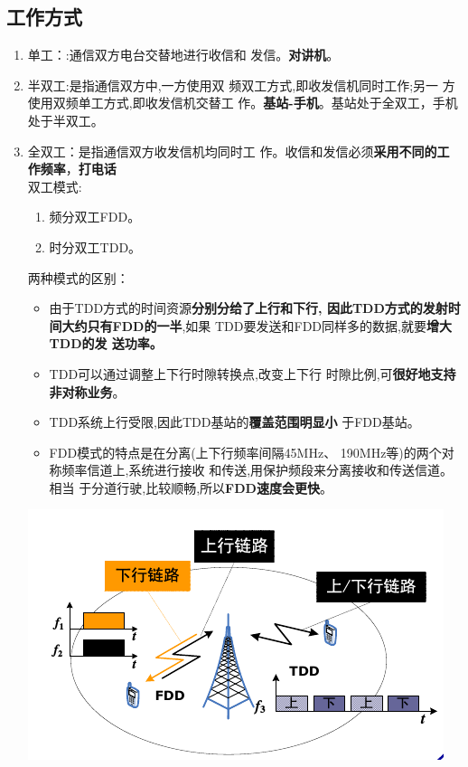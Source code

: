 \documentclass[a4paper ]{report}
\begin{document}
	\subsection{工作方式}
	\begin{enumerate}
		\item 单工：:通信双方电台交替地进行收信和
		发信。\textbf{对讲机}。
		\item 半双工:是指通信双方中,一方使用双
		频双工方式,即收发信机同时工作;另一
		方使用双频单工方式,即收发信机交替工
		作。\textbf{基站-手机}。基站处于全双工，手机处于半双工。
		\item 全双工：是指通信双方收发信机均同时工
		作。收信和发信必须\textbf{采用不同的工作频率}，\textbf{打电话}	\\
		
		双工模式:
		\begin{enumerate}
		\item 频分双工FDD。
		\item 时分双工TDD。
		\end{enumerate}
		两种模式的区别：
		\begin{itemize}
			\item 由于TDD方式的时间资源\textbf{分别分给了上行和下行,
			因此TDD方式的发射时间大约只有FDD的一半},如果
			TDD要发送和FDD同样多的数据,就要\textbf{增大TDD的发
			送功率。}
			\item TDD可以通过调整上下行时隙转换点,改变上下行
			时隙比例,可\textbf{很好地支持非对称业务}。
			\item TDD系统上行受限,因此TDD基站的\textbf{覆盖范围明显小}
			于FDD基站。
			\item FDD模式的特点是在分离(上下行频率间隔45MHz、
			190MHz等)的两个对称频率信道上,系统进行接收
			和传送,用保护频段来分离接收和传送信道。相当
			于分道行驶,比较顺畅,所以\textbf{FDD速度会更快}。
			
		\end{itemize}
		\begin{center}
			\includegraphics[scale=1]{双工模式.png}
		\end{center}
	\end{enumerate}
\end{document}
